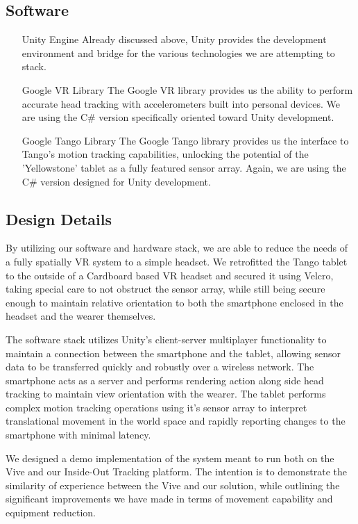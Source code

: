 \documentclass{report}
\begin{document}
	\subsection*{Software}
	\begin{itemize}
		\item[Unity Engine] Already discussed above, Unity provides the development environment and bridge for the various technologies we are attempting to stack.
		\item[Google VR Library] The Google VR library provides us the ability to perform accurate head tracking with accelerometers built into personal devices. We are using the C\# version specifically oriented toward Unity development.
		\item[Google Tango Library] The Google Tango library provides us the interface to Tango's motion tracking capabilities, unlocking the potential of the 'Yellowstone' tablet as a fully featured sensor array. Again, we are using the C\# version designed for Unity development.
	\end{itemize}
	
	\subsection*{Design Details}
		By utilizing our software and hardware stack, we are able to reduce the needs of a fully spatially VR system to a simple headset. We retrofitted the Tango tablet to the outside of a Cardboard based VR headset and secured it using Velcro, taking special care to not obstruct the sensor array, while still being secure enough to maintain relative orientation to both the smartphone enclosed in the headset and the wearer themselves.
		
		The software stack utilizes Unity's client-server multiplayer functionality to maintain a connection between the smartphone and the tablet, allowing sensor data to be transferred quickly and robustly over a wireless network. The smartphone acts as a server and performs rendering action along side head tracking to maintain view orientation with the wearer. The tablet performs complex motion tracking operations using it's sensor array to interpret translational movement in the world space and rapidly reporting changes to the smartphone with minimal latency.
		
		We designed a demo implementation of the system meant to run both on the Vive and our Inside-Out Tracking platform. The intention is to demonstrate the similarity of experience between the Vive and our solution, while outlining the significant improvements we have made in terms of movement capability and equipment reduction.
		
\end{document}
